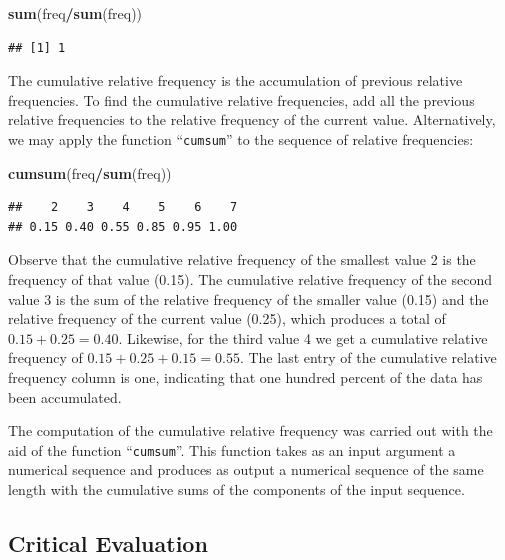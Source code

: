 \documentclass[]{krantz}
\makeatletter
\newenvironment{Shaded}{\begin{snugshade}}{\end{snugshade}}
\newcommand{\KeywordTok}[1]{\textcolor[rgb]{0.13,0.29,0.53}{\textbf{#1}}}
\newcommand{\OperatorTok}[1]{\textcolor[rgb]{0.81,0.36,0.00}{\textbf{#1}}}
\newcommand{\NormalTok}[1]{#1}
\newenvironment{kframe}{%
\medskip{}
\setlength{\fboxsep}{.8em}
 \def\at@end@of@kframe{}%
 \ifinner\ifhmode%
  \def\at@end@of@kframe{\end{minipage}}%
  \begin{minipage}{\columnwidth}%
 \fi\fi%
 \def\FrameCommand##1{\hskip\@totalleftmargin \hskip-\fboxsep
 \colorbox{shadecolor}{##1}\hskip-\fboxsep
     \hskip-\linewidth \hskip-\@totalleftmargin \hskip\columnwidth}%
 \MakeFramed {\advance\hsize-\width
   \@totalleftmargin\z@ \linewidth\hsize
   \@setminipage}}%
 {\par\unskip\endMakeFramed%
 \at@end@of@kframe}
\renewenvironment{Shaded}{\begin{kframe}}{\end{kframe}}
\theoremstyle{definition}
\theoremstyle{definition}
\theoremstyle{definition}
\theoremstyle{remark}
\makeatother
\begin{document}
\begin{Shaded}
\begin{Highlighting}[]
\KeywordTok{sum}\NormalTok{(freq}\OperatorTok{/}\KeywordTok{sum}\NormalTok{(freq))}
\end{Highlighting}
\end{Shaded}

\begin{verbatim}
## [1] 1
\end{verbatim}

The cumulative relative frequency is the accumulation of previous
relative frequencies. To find the cumulative relative frequencies, add
all the previous relative frequencies to the relative frequency of the
current value. Alternatively, we may apply the function
``\texttt{cumsum}'' to the sequence of relative frequencies:

\begin{Shaded}
\begin{Highlighting}[]
\KeywordTok{cumsum}\NormalTok{(freq}\OperatorTok{/}\KeywordTok{sum}\NormalTok{(freq))}
\end{Highlighting}
\end{Shaded}

\begin{verbatim}
##    2    3    4    5    6    7 
## 0.15 0.40 0.55 0.85 0.95 1.00
\end{verbatim}

Observe that the cumulative relative frequency of the smallest value 2
is the frequency of that value (0.15). The cumulative relative frequency
of the second value 3 is the sum of the relative frequency of the
smaller value (0.15) and the relative frequency of the current value
(0.25), which produces a total of \(0.15 + 0.25 = 0.40\). Likewise, for
the third value 4 we get a cumulative relative frequency of
\(0.15 + 0.25 + 0.15 = 0.55\). The last entry of the cumulative relative
frequency column is one, indicating that one hundred percent of the data
has been accumulated.

The computation of the cumulative relative frequency was carried out
with the aid of the function ``\texttt{cumsum}''. This function takes as
an input argument a numerical sequence and produces as output a
numerical sequence of the same length with the cumulative sums of the
components of the input sequence.

\subsection{Critical Evaluation}\label{critical-evaluation}
\end{document}
